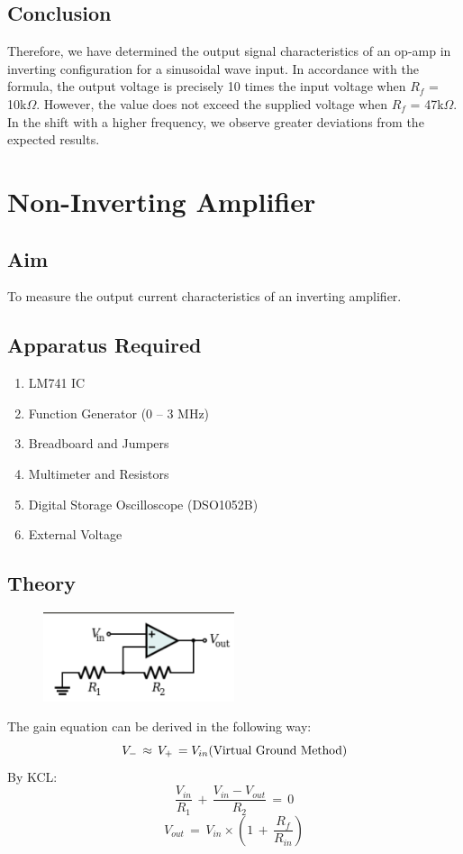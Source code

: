 \documentclass{article}
\begin{document}
\subsection{Conclusion}
Therefore, we have determined the output signal characteristics of an op-amp in inverting configuration for a sinusoidal wave input. In accordance with the formula, the output voltage is precisely 10 times the input voltage when $R_{f}$ = 10k$\Omega$. However, the value does not exceed the supplied voltage when $R_{f}$ = 47k$\Omega$. In the shift with a higher frequency, we observe greater deviations from the expected results.
\newpage
\section{Non-Inverting Amplifier}
\subsection{Aim}
To measure the output current characteristics of an inverting amplifier.
\subsection{Apparatus Required}
\begin{enumerate}
    \item LM741 IC
    \item Function Generator (0 – 3 MHz)
    \item Breadboard and Jumpers
    \item Multimeter and Resistors
    \item Digital Storage Oscilloscope (DSO1052B)
    \item External Voltage
\end{enumerate}
\subsection{Theory}
\begin{figure}
\includegraphics[width=0.5\textwidth]{i10.png}
\end{figure}
The gain equation can be derived in the following way:\\
\begin{equation}
    V_{-}\, \approx\, V_{+}\, = V_{in}(\textrm{Virtual Ground Method})\\
\end{equation}
By KCL:
\begin{equation}
    \frac{V_{in}}{R_{1}}\, +\, \frac{V_{in}-V_{out}}{R_{2}}\, =\, 0
\end{equation}
\begin{equation}
    V_{out}\, =\, V_{in}\times(1\, +\,  \frac{R_{f}}{R_{in}})
\end{equation}
\end{document}
